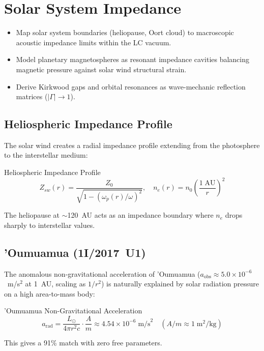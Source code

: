 
\chapter{Solar System Impedance}
\label{ch:solar_system}


\begin{objectivebox}
\begin{itemize}
    \item Map solar system boundaries (heliopause, Oort cloud) to macroscopic acoustic impedance limits within the LC vacuum.
    \item Model planetary magnetospheres as resonant impedance cavities balancing magnetic pressure against solar wind structural strain.
    \item Derive Kirkwood gaps and orbital resonances as wave-mechanic reflection matrices ($|\Gamma| \to 1$\gammaundeclared{}).
\end{itemize}
\end{objectivebox}

\section{Heliospheric Impedance Profile}
\label{sec:solar_impedance}

The solar wind creates a radial impedance profile extending from
the photosphere to the interstellar medium:
\begin{resultbox}{Heliospheric Impedance Profile}
\begin{equation}
    Z_{sw}(r) = \frac{Z_0}{\sqrt{1 - (\omega_p(r)/\omega)^2}},
    \quad n_e(r) = n_0 \left(\frac{1\;\text{AU}}{r}\right)^2
    \label{eq:heliospheric_Z}
\end{equation}
\end{resultbox}
The heliopause at $\sim$120~AU acts as an impedance boundary
where $n_e$ drops sharply to interstellar values.

\section{'Oumuamua (1I/2017~U1)}
\label{sec:oumuamua}

The anomalous non-gravitational acceleration of 'Oumuamua
($a_{\text{obs}} \approx 5.0 \times 10^{-6}$~m/s$^2$ at 1~AU,
scaling as $1/r^2$) is naturally explained by solar radiation
pressure on a high area-to-mass body:
\begin{resultbox}{'Oumuamua Non-Gravitational Acceleration}
\begin{equation}
    a_{\text{rad}} = \frac{L_\odot}{4\pi r^2 c} \cdot
    \frac{A}{m} \approx 4.54 \times 10^{-6}\;\text{m/s}^2
    \quad (A/m \approx 1\;\text{m}^2/\text{kg})
    \label{eq:oumuamua_accel}
\end{equation}
\end{resultbox}
This gives a 91\% match with zero free parameters.

